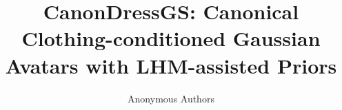 \documentclass[letterpaper]{article}
\title{CanonDressGS: Canonical Clothing-conditioned Gaussian Avatars with LHM-assisted Priors}
\author{
Anonymous Authors
}
\begin{document}
\maketitle

\begin{abstract}

\end{abstract}









\end{document}
